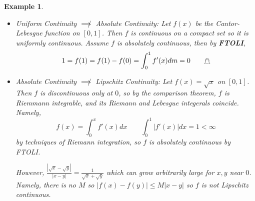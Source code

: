 \documentclass[12pt]{Qual}
\newtheorem{example}{Example}
\begin{document}
\begin{example}
$\,$

\begin{itemize}
\setlength\itemsep{-0.1em}
\renewcommand\labelitemi{\faBug}
    \item Uniform Continuity $\not\implies$ Absolute Continuity: Let $f(x)$ be the Cantor-Lebesgue function on $[0,1]$. Then $f$ is continuous on a compact set so it is uniformly continuous. Assume $f$ is absolutely continuous, then by \textbf{FTOLI}, \vspace{-0.25cm} $$1=f(1)=f(1)-f(0)=\int_0^1f'(x)dm=0 \qquad \mathghost$$
    \vspace{-0.5cm}
    \item Absolute Continuity $\not\implies$ Lipschitz Continuity: Let $f(x)=\sqrt{x}$ on $[0,1]$. Then $f$ is discontinuous only at $0$, so by the comparison theorem, $f$ is Riemmann integrable, and its Riemann and Lebesgue integerals coincide. Namely, $$f(x)=\int_0^xf'(x)dx\qquad \int_0^1|f'(x)|dx=1<\infty$$ by techniques of Riemann integration, so $f$ is absolutely continuous by FTOLI.

    However, $\displaystyle\frac{|\sqrt{x}-\sqrt{y}|}{|x-y|}=\frac{1}{\sqrt{x}+\sqrt{y}}$ which can grow arbitrarily large for $x,y$ near $0$. Namely, there is no $M$ so $|f(x)-f(y)|\le M|x-y|$ so $f$ is not Lipschitz continuous.
\end{itemize}
\end{example}
\vspace{0.5cm}
\newpage
\end{document}
